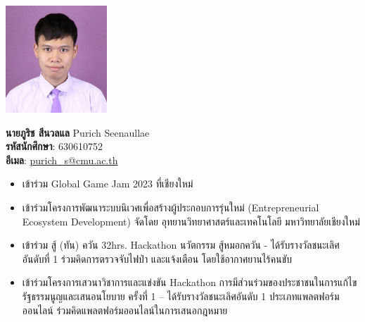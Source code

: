 \documentclass[semifinal]{cpecmu}
\begin{document}
\begin{biosketch}
  \begin{center}
    \includegraphics[width=1.5in]{./img/rich.png}
  \end{center}
  \textbf{นายภูริช สีนวลแล} Purich Seenaullae \\
  \textbf{รหัสนักศึกษา}: 630610752 \\
  \textbf{อีเมล}: \href{mailto:purich_s@cmu.ac.th}{purich\_s@cmu.ac.th}
  \begin{itemize}
    \item เข้าร่วม Global Game Jam 2023 ที่เชียงใหม่
    \item	เข้าร่วมโครงการพัฒนาระบบนิเวศเพื่อสร้างผู้ประกอบการรุ่นใหม่ (Entrepreneurial Ecosystem Development) จัดโดย อุทยานวิทยาศาสตร์และเทคโนโลยี มหาวิทยาลัยเชียงใหม่
    \item เข้าร่วม สู้ (ทัน) ควัน 32hrs. Hackathon นวัตกรรม สู้หมอกควัน - ได้รับรางวัลชนะเลิศอันดับที่ 1 ร่วมคิดการตรวจจับไฟป่า และแจ้งเตือน โดยใช้อากาศยานไร้คนขับ
    \item เข้าร่วมโครงการเสวนาวิชาการและแข่งขัน Hackathon การมีส่วนร่วมของประชาชนในการแก้ไขรัฐธรรมนูญและเสนอนโยบาย ครั้งที่ 1 – ได้รับรางวัลชนะเลิศอันดับ 1 ประเภทแพลตฟอร์มออนไลน์ ร่วมคิดแพลตฟอร์มออนไลน์ในการเสนอกฎหมาย
  \end{itemize}
\end{biosketch}
\fi %
\end{document}
